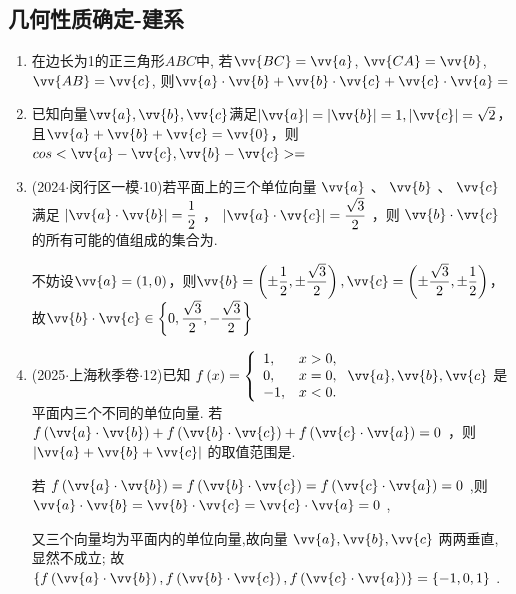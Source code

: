 \subsection*{几何性质确定-建系}
\begin{enumerate}
    \item 在边长为1的正三角形$ABC$中, 若$\vv{BC}=\vv{a}$, $\vv{CA}=\vv{b}$, $\vv{AB}=\vv{c}$, 则$\vv{a}\cdot\vv{b}+\vv{b}\cdot\vv{c}+\vv{c}\cdot\vv{a}=$
    \item 已知向量$\vv{a}, \vv{b}, \vv{c}$满足$|\vv{a}| = |\vv{b}| = 1, |\vv{c}| = \sqrt{2}$，且$\vv{a} + \vv{b} + \vv{c} = \vv{0}$，则$cos<\vv{a} - \vv{c}, \vv{b} - \vv{c}> = $ 
    \item (2024$\cdot$闵行区一模$\cdot$10)若平面上的三个单位向量 $\vv{a}$ 、 $\vv{b}$ 、 $\vv{c}$ 满足 $\left| {\vv{a} \cdot  \vv{b}}\right|  = \dfrac{1}{2}$ ， $\left| {\vv{a} \cdot  \vv{c}}\right|  = \dfrac{\sqrt{3}}{2}$ ，则 $\vv{b} \cdot  \vv{c}$ 的所有可能的值组成的集合为.
    \begin{jieda}
        不妨设$\vv{a} = (1, 0)$，则$\vv{b} = \left(\pm \dfrac{1}{2}, \pm \dfrac{\sqrt{3}}{2}\right), \vv{c} = \left(\pm \dfrac{\sqrt{3}}{2}, \pm \dfrac{1}{2}\right)$，故$\vv{b} \cdot  \vv{c} \in \left\{  {0,\dfrac{\sqrt{3}}{2}, - \dfrac{\sqrt{3}}{2}}\right\}$
    \end{jieda}
    \item (2025$\cdot$上海秋季卷$\cdot$12)已知 $f\left( x\right)  = \left\{  \begin{array}{ll} 1,&x > 0, \\  0,&x = 0, \\   - 1,&x < 0. \end{array}\right. \vv{a},\vv{b},\vv{c}$ 是平面内三个不同的单位向量. 若 $f\left( {\vv{a} \cdot  \vv{b}}\right)  + f\left( {\vv{b} \cdot  \vv{c}}\right)  + f\left( {\vv{c} \cdot  \vv{a}}\right)  = 0$ ，则 $\left| {\vv{a} + \vv{b} + \vv{c}}\right|$ 的取值范围是.
    \begin{jieda}
        若 $f\left( {\vv{a} \cdot  \vv{b}}\right)  = f\left( {\vv{b} \cdot  \vv{c}}\right)  = f\left( {\vv{c} \cdot  \vv{a}}\right)  = 0$ ,则 $\vv{a} \cdot  \vv{b} = \vv{b} \cdot  \vv{c} = \vv{c} \cdot  \vv{a} = 0$ ,
        
        又三个向量均为平面内的单位向量,故向量 $\vv{a},\vv{b},\vv{c}$ 两两垂直,显然不成立; 故 $\left\{  {f\left( {\vv{a} \cdot  \vv{b}}\right) ,f\left( {\vv{b} \cdot  \vv{c}}\right) ,f\left( {\vv{c} \cdot  \vv{a}}\right) }\right\}   = \{  - 1,0,1\}$ .
        

\end{jieda}
\end{enumerate}
